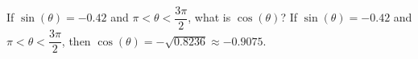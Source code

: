 {If $\sin(\theta) = -0.42$ and $\pi < \theta < \dfrac{3\pi}{2}$, what is  $\cos(\theta)$?}
{If $\sin(\theta) = -0.42$ and $\pi < \theta < \dfrac{3\pi}{2}$, then $\cos(\theta) = -\sqrt{0.8236} \approx -0.9075$.}